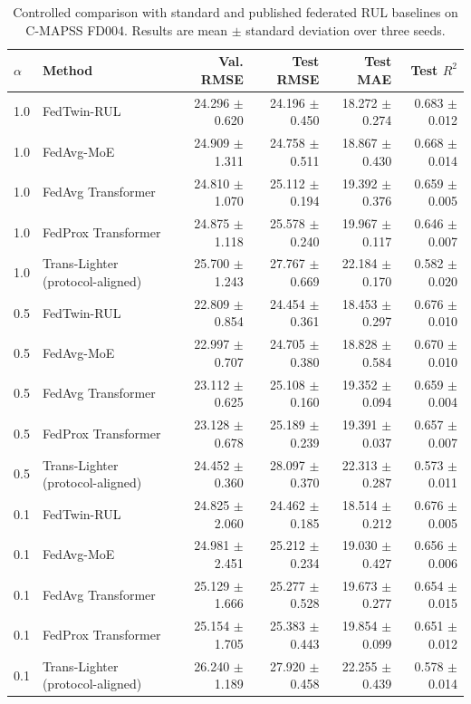 \begin{table}[t]
\centering
\caption{Controlled comparison with standard and published federated RUL baselines on C-MAPSS FD004. Results are mean $\pm$ standard deviation over three seeds.}
\label{tab:published_baselines}
\begin{tabular}{llrrrr}
\hline
$\alpha$ & Method & Val. RMSE & Test RMSE & Test MAE & Test $R^2$ \\
\hline
1.0 & FedTwin-RUL & 24.296 $\pm$ 0.620 & 24.196 $\pm$ 0.450 & 18.272 $\pm$ 0.274 & 0.683 $\pm$ 0.012 \\
1.0 & FedAvg-MoE & 24.909 $\pm$ 1.311 & 24.758 $\pm$ 0.511 & 18.867 $\pm$ 0.430 & 0.668 $\pm$ 0.014 \\
1.0 & FedAvg Transformer & 24.810 $\pm$ 1.070 & 25.112 $\pm$ 0.194 & 19.392 $\pm$ 0.376 & 0.659 $\pm$ 0.005 \\
1.0 & FedProx Transformer & 24.875 $\pm$ 1.118 & 25.578 $\pm$ 0.240 & 19.967 $\pm$ 0.117 & 0.646 $\pm$ 0.007 \\
1.0 & Trans-Lighter (protocol-aligned) & 25.700 $\pm$ 1.243 & 27.767 $\pm$ 0.669 & 22.184 $\pm$ 0.170 & 0.582 $\pm$ 0.020 \\
\hline
0.5 & FedTwin-RUL & 22.809 $\pm$ 0.854 & 24.454 $\pm$ 0.361 & 18.453 $\pm$ 0.297 & 0.676 $\pm$ 0.010 \\
0.5 & FedAvg-MoE & 22.997 $\pm$ 0.707 & 24.705 $\pm$ 0.380 & 18.828 $\pm$ 0.584 & 0.670 $\pm$ 0.010 \\
0.5 & FedAvg Transformer & 23.112 $\pm$ 0.625 & 25.108 $\pm$ 0.160 & 19.352 $\pm$ 0.094 & 0.659 $\pm$ 0.004 \\
0.5 & FedProx Transformer & 23.128 $\pm$ 0.678 & 25.189 $\pm$ 0.239 & 19.391 $\pm$ 0.037 & 0.657 $\pm$ 0.007 \\
0.5 & Trans-Lighter (protocol-aligned) & 24.452 $\pm$ 0.360 & 28.097 $\pm$ 0.370 & 22.313 $\pm$ 0.287 & 0.573 $\pm$ 0.011 \\
\hline
0.1 & FedTwin-RUL & 24.825 $\pm$ 2.060 & 24.462 $\pm$ 0.185 & 18.514 $\pm$ 0.212 & 0.676 $\pm$ 0.005 \\
0.1 & FedAvg-MoE & 24.981 $\pm$ 2.451 & 25.212 $\pm$ 0.234 & 19.030 $\pm$ 0.427 & 0.656 $\pm$ 0.006 \\
0.1 & FedAvg Transformer & 25.129 $\pm$ 1.666 & 25.277 $\pm$ 0.528 & 19.673 $\pm$ 0.277 & 0.654 $\pm$ 0.015 \\
0.1 & FedProx Transformer & 25.154 $\pm$ 1.705 & 25.383 $\pm$ 0.443 & 19.854 $\pm$ 0.099 & 0.651 $\pm$ 0.012 \\
0.1 & Trans-Lighter (protocol-aligned) & 26.240 $\pm$ 1.189 & 27.920 $\pm$ 0.458 & 22.255 $\pm$ 0.439 & 0.578 $\pm$ 0.014 \\
\hline
\end{tabular}
\end{table}